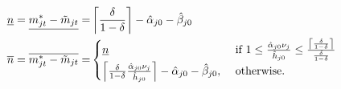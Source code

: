 \begin{outline}
\begin{align*}
    \underline{n} 
    = 
    \underline{m_{jt}^* - \tilde{m}_{jt}} 
    =& \left\lceil \frac{\delta}{1 - \delta} \right\rceil - \hat{\alpha}_{j0} - \hat{\beta}_{j0}
    \\
    \overline{n}
    =
    \overline{m_{jt}^* - \tilde{m}_{jt}}
    =&
    \begin{cases}
        \underline{n}
        &\text{ if } 1 \leq \frac{\hat{\alpha}_{j0} \nu_j}{\hat{h}_{j0}} \leq \frac{\left\lceil \frac{\delta}{1 - \delta} \right\rceil}{\frac{\delta}{1 - \delta}}
        \\
        \left\lceil \frac{\delta}{1 - \delta} \frac{\hat{\alpha}_{j0} \nu_j}{\hat{h}_{j0}} \right\rceil - \hat{\alpha}_{j0} - \hat{\beta}_{j0},
        &\text{ otherwise.}
    \end{cases}
\end{align*}


\end{outline}
